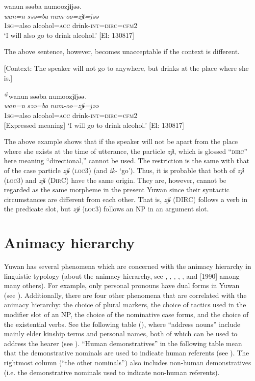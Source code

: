 {\TM}
\glll wanun  səəba  numoozjɨjəə.\\
\textit{wan=n}  \textit{səə=ba}  \textit{num-oo=zjɨ=jəə}\\
    1\textsc{sg}=also  alcohol=\textsc{acc}  drink-\textsc{int}=\textsc{dirc}=\textsc{cfm}2\\
\glt    ‘I will also go to drink alcohol.’ [El: 130817]
\z

The above sentence, however, becomes unacceptable if the context is different.

\ea\label{ex:6-91}
  [Context: The speaker will not go to anywhere, but drinks at the place where she is.]

{\TM}
\glll \textsuperscript{\#}wanun  səəba  numoozjɨjəə.\\
\textit{wan=n}  \textit{səə=ba}  \textit{num-oo=zjɨ=jəə}\\
    1\textsc{sg}=also  alcohol=\textsc{acc}  drink-\textsc{int}=\textsc{dirc}=\textsc{cfm}2\\
    {}[Expressed meaning] ‘I will go to drink alcohol.’ [El: 130817]
    \z

The above example shows that if the speaker will not be apart from the place where she exists at the time of utterance, the particle \textit{zjɨ}, which is glossed “\textsc{dirc}” here meaning “directional,” cannot be used. The restriction is the same with that of the case particle \textit{zjɨ} (\textsc{loc3}) (and \textit{ik-} ‘go’). Thus, it is probable that both of \textit{zjɨ} (\textsc{loc3}) and \textit{zjɨ} (D\textsc{ir}C) have the same origin. They are, however, cannot be regarded as the same morpheme in the present Yuwan since their syntactic circumstances are different from each other. That is, \textit{zjɨ} (DIRC) follows a verb in the predicate slot, but \textit{zjɨ} (\textsc{loc3}) follows an NP in an argument slot.

\section{Animacy hierarchy}

Yuwan has several phenomena which are concerned with the animacy hierarchy in linguistic typology (about the animacy hierarchy, see \citealt{Silverstein1976}, \citealt{Comrie1989}, \citealt{Dixon1994}, \citealt{Whaley1997}, \citealt{Corbett2000}, and \citealt{Croft2003} [1990] among many others). For example, only personal pronouns have dual forms in Yuwan (see ). Additionally, there are four other phenomena that are correlated with the animacy hierarchy: the choice of plural markers, the choice of tactics used in the modifier slot of an NP, the choice of the nominative case forms, and the choice of the existential verbs. See the following table (), where “address nouns” include mainly elder kinship terms and personal names, both of which can be used to address the hearer (see ). “Human demonstratives” in the following table mean that the demonstrative nominals are used to indicate human referents (see ). The rightmost column (“the other nominals”) also includes non-human demonstratives (i.e. the demonstrative nominals used to indicate non-human referents).


